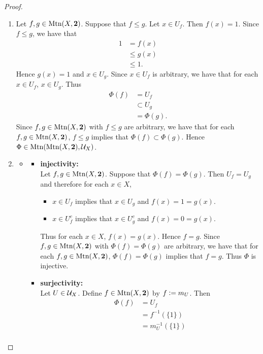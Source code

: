 \documentclass{book}
\begin{document}
	\begin{proof}\
		\begin{enumerate}
			\item Let $f,g \in \operatorname{\text{Mtn}}(X, \mathbf{2})$. Suppose that $f \leq g$. Let $x \in U_f$. Then $f(x) = 1$. Since $f \leq g$, we have that 
			\begin{align*}
				1
				& = f(x) \\
				& \leq g(x) \\
				& \leq 1.
			\end{align*}
			Hence $g(x) =1$ and $x \in U_g$. Since $x \in U_f$ is arbitrary, we have that for each $x \in U_f$, $x \in U_g$. Thus  
			\begin{align*}
				\Phi(f)
				& = U_f \\
				& \subset U_g \\
				& = \Phi(g).
			\end{align*}
			Since $f,g \in \operatorname{\text{Mtn}}(X, \mathbf{2})$ with $f \leq g$ are arbitrary, we have that for each $f,g \in \operatorname{\text{Mtn}}(X, \mathbf{2})$, $f \leq g$ implies that $\Phi(f) \subset \Phi(g)$. Hence $\Phi \in \operatorname{\text{Mtn}}(\operatorname{\text{Mtn}}(X, \mathbf{2}), \mathcal{U}_X)$. 
			\item 
			\begin{itemize}
				\item 
				\begin{itemize}
					\item \textbf{injectivity:} \\
					Let $f, g \in \operatorname{\text{Mtn}}(X, \mathbf{2})$. Suppose that $\Phi(f) = \Phi(g)$. Then $U_f = U_g$ and therefore for each $x \in X$, 
					\begin{itemize}
						\item $x \in U_f$ implies that $x \in U_g$ and $f(x) = 1 = g(x)$.
						\item $x \in U_f^c$ implies that $x \in U_g^c$ and $f(x) = 0 = g(x)$.
					\end{itemize}
					Thus for each $x \in X$, $f(x) = g(x)$. Hence $f = g$. Since $f, g \in \operatorname{\text{Mtn}}(X, \mathbf{2})$ with $\Phi(f) = \Phi(g)$ are arbitrary, we have that for each $f, g \in \operatorname{\text{Mtn}}(X, \mathbf{2})$, $\Phi(f) = \Phi(g)$ implies that $f = g$. Thus $\Phi$ is injective.
					\item \textbf{surjectivity:} \\
					Let $U \in \mathcal{U}_X$. Define $f \in \operatorname{\text{Mtn}}(X, \mathbf{2})$ by $f \vcentcolon= m_U$. Then 
					\begin{align*}
						\Phi(f)
						& = U_f \\
						& = f^{-1}(\{1\}) \\
						& = m_U^{-1}(\{1\}) \\

\end{align*}
\end{itemize}
\end{itemize}
\end{enumerate}
\end{proof}
\end{document}
